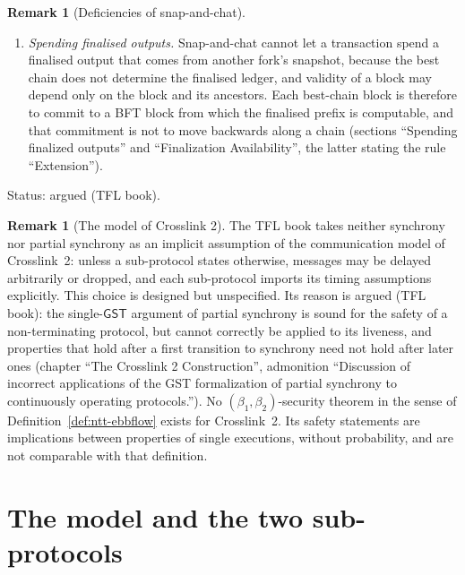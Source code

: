 \documentclass[11pt,a4paper]{article}
\theoremstyle{definition}
\newtheorem{remark}[theorem]{Remark}
\newcommand{\GST}{\mathsf{GST}}
\begin{document}
\begin{remark}[Deficiencies of snap-and-chat]
\begin{enumerate}[label=(\arabic*)]
  anchor can become valid at a later position; expiry, by contrast, is never
  undone. The ledgers are therefore to be plain block chains, and
  sanitisation disappears (section ``Subtlety in the definition of
  sanitization''; chapter ``The Crosslink 2 Construction'', section
  ``Locally finalized chain'').
\item \emph{Spending finalised outputs.} Snap-and-chat cannot let a
  transaction spend a finalised output that comes from another fork's
  snapshot, because the best chain does not determine the finalised ledger,
  and validity of a block may depend only on the block and its ancestors.
  Each best-chain block is therefore to commit to a BFT block from which the
  finalised prefix is computable, and that commitment is not to move
  backwards along a chain (sections ``Spending finalized outputs'' and
  ``Finalization Availability'', the latter stating the rule
  ``Extension'').
\end{enumerate}

Status: argued (TFL book).
\end{remark}

\begin{remark}[The model of Crosslink 2]\label{rem:cl-model}
The TFL book takes neither synchrony nor partial synchrony as an implicit
assumption of the communication model of Crosslink~2: unless a sub-protocol
states otherwise, messages may be delayed arbitrarily or dropped, and each
sub-protocol imports its timing assumptions explicitly. This choice is
designed but unspecified. Its reason is argued (TFL book): the single-$\GST$
argument of partial synchrony is sound for the safety of a non-terminating
protocol, but cannot correctly be applied to its liveness, and properties
that hold after a first transition to synchrony need not hold after later
ones (chapter ``The Crosslink 2 Construction'', admonition ``Discussion of
incorrect applications of the GST formalization of partial synchrony to
continuously operating protocols.''). No $(\beta_1, \beta_2)$-security
theorem in the sense of Definition~\ref{def:ntt-ebbflow} exists for
Crosslink~2. Its safety statements are implications between properties of
single executions, without probability, and are not comparable with that
definition.
\end{remark}

\section{The model and the two sub-protocols}\label{sec:iface}
\end{document}
